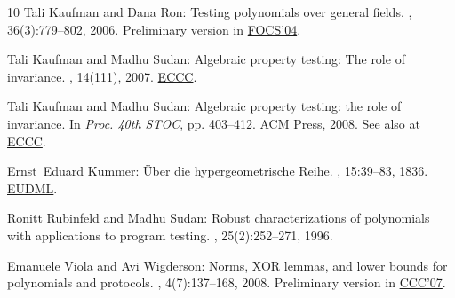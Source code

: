 \begin{thebibliography}{10}
{\sc Tali Kaufman and Dana Ron}: Testing polynomials over general fields.
, 36(3):779--802, 2006.
\newblock Preliminary version in
  \href{http://dx.doi.org/10.1109/FOCS.2004.65}{FOCS'04}.
\newblock [\epfmtdoi{10.1137/S0097539704445615}]

{\sc Tali Kaufman and Madhu Sudan}: Algebraic property testing: The role of
  invariance.
, 14(111), 2007.
\newblock \href{http://eccc.hpi-web.de/report/2007/111/}{ECCC}.

{\sc Tali Kaufman and Madhu Sudan}: Algebraic property testing: the role of
  invariance.
\newblock In {\em Proc. 40th STOC}, pp. 403--412. ACM Press, 2008.
\newblock See also at \href{http://eccc.hpi-web.de/report/2007/111/}{ECCC}.
\newblock [\epfmtdoi{10.1145/1374376.1374434}]

{\sc Ernst~Eduard Kummer}: {\"U}ber die hypergeometrische {R}eihe.
, 15:39--83,
  1836.
\newblock \href{https://eudml.org/doc/146951}{EUDML}.

{\sc Ronitt Rubinfeld and Madhu Sudan}: Robust characterizations of polynomials
  with applications to program testing.
, 25(2):252--271, 1996.
\newblock [\epfmtdoi{10.1137/S0097539793255151}]

{\sc Emanuele Viola and Avi Wigderson}: Norms, {XOR} lemmas, and lower bounds
  for polynomials and protocols.
, 4(7):137--168, 2008.
\newblock Preliminary version in
  \href{http://dx.doi.org/10.1109/CCC.2007.15}{CCC'07}.

\end{thebibliography}

